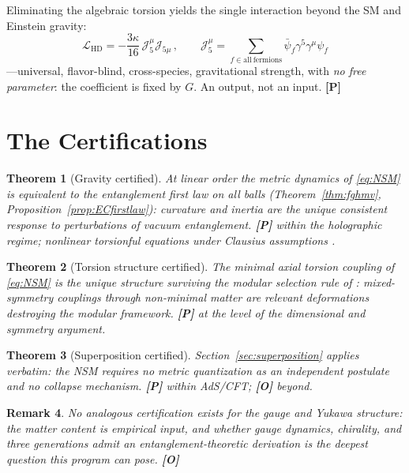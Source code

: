 \documentclass[11pt]{article}
\newtheorem{theorem}{Theorem}[section]
\newtheorem{remark}[theorem]{Remark}
\theoremstyle{definition}
\newcommand{\pP}{\textbf{[P]}}
\newcommand{\pO}{\textbf{[O]}}
\begin{document}
Eliminating the algebraic torsion yields the single interaction beyond the
SM and Einstein gravity:
\begin{equation}
\boxed{\;
\mathcal L_{\mathrm{HD}}=-\frac{3\kappa}{16}\,
\mathcal J_5^\mu\mathcal J_{5\mu}\,,\qquad
\mathcal J_5^\mu=\!\!\sum_{f\in\mathrm{all\ fermions}}\!\!
\bar\psi_f\gamma^5\gamma^\mu\psi_f\;}
\label{eq:HD}
\end{equation}
---universal, flavor-blind, cross-species, gravitational strength, with
\emph{no free parameter}: the coefficient is fixed by $G$. An output, not
an input. \pP{}

\section{The Certifications}
\label{sec:certifications}

\begin{theorem}[Gravity certified]
At linear order the metric dynamics of \eqref{eq:NSM} is equivalent to the
entanglement first law on all balls (Theorem~\ref{thm:fghmv},
Proposition~\ref{prop:ECfirstlaw}): curvature and inertia are the unique
consistent response to perturbations of vacuum entanglement. \pP{} within
the holographic regime; nonlinear torsionful equations under Clausius
assumptions \cite{Jacobson1995,DLP2017}. 
\end{theorem}

\begin{theorem}[Torsion structure certified]
The minimal axial torsion coupling of \eqref{eq:NSM} is the unique
structure surviving the modular selection rule of \cite{McGwier2026b}:
mixed-symmetry couplings through non-minimal matter are relevant
deformations destroying the modular framework. \pP{} at the level of the
dimensional and symmetry argument.
\end{theorem}

\begin{theorem}[Superposition certified]
Section~\ref{sec:superposition} applies verbatim: the NSM requires no
metric quantization as an independent postulate and no collapse
mechanism. \pP{} within AdS/CFT; \pO{} beyond.
\end{theorem}

\begin{remark}
No analogous certification exists for the gauge and Yukawa structure:
the matter content is empirical input, and whether gauge dynamics,
chirality, and three generations admit an entanglement-theoretic
derivation is the deepest question this program can pose. \pO{}
\end{remark}
\end{document}
